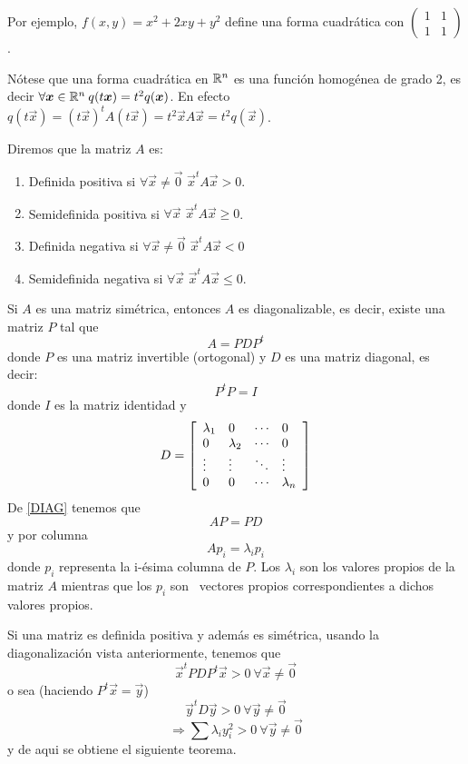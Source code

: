Por ejemplo, $f(x,y)=x^2+2xy+y^2$ define una forma cuadr\'atica con $\begin{pmatrix}
1 & 1 \\
1 & 1
\end{pmatrix}$.

N\'otese que una forma cuadr\'atica en $\mathbb{R}^n$ es una funci\'on homog\'enea de grado 2, es decir $\forall \boldsymbol{x}\in \mathbb{R}^n\: q(t\boldsymbol{x})=t^2q(\boldsymbol{x})$. En efecto $q(t\vec{x})=(t\vec{x})^t A (t\vec{x})=t^2\vec{x}A\vec{x}=t^2q(\vec{x})$.

\begin{definicion}
Diremos que la matriz $A$ es:
\begin{enumerate}
\item Definida positiva si $\forall \vec{x}\neq \vec{0}$ $\vec{x}^t A \vec{x}>0$.
\item Semidefinida positiva si $\forall \vec{x}$ $\vec{x}^t A \vec{x}\geq 0$.
\item Definida negativa si $\forall \vec{x}\neq \vec{0}$ $\vec{x}^t A \vec{x}<0$
\item Semidefinida negativa si $\forall \vec{x}$ $\vec{x}^t A \vec{x}\leq 0$.
\end{enumerate}
\end{definicion}

Si $A$ es una matriz sim\'etrica, entonces $A$ es diagonalizable, es decir,
existe una matriz $P$ tal que
\begin{equation}\label{DIAG}
A=PDP^t
\end{equation}
donde $P$ es una matriz invertible (ortogonal) y $D$ es una matriz diagonal,
es decir:
\[
P^tP=I
\]
donde $I$ es la matriz identidad y
\[
D=\left[
\begin{array}
[c]{llll}%
\lambda_{1} & 0 & \cdots & 0\\
0 & \lambda_{2} & \cdots & 0\\
\vdots & \vdots & \ddots & \vdots\\
0 & 0 & \cdots & \lambda_{n}%
\end{array}
\right]
\]
De \eqref{DIAG} tenemos que
\[
AP=PD
\]
y por columna
\[
Ap_i=\lambda_ip_i%
\]
donde $p_i$ representa la i-\'esima columna de $P$. Los $\lambda_i$ son
los valores propios de la matriz $A$ mientras que los $p_i$ son \ vectores
propios correspondientes a dichos valores propios.

Si una matriz es definida positiva y adem\'as es sim\'etrica, usando la diagonalizaci\'on vista
anteriormente, tenemos que
\[
\vec{x}^tPDP^t\vec{x}>0\:\forall \vec{x}\neq \vec{0}
\]
o sea (haciendo $P^t\vec{x}=\vec{y}$)
\[
\vec{y}^tD\vec{y}>0\:\forall \vec{y}\neq \vec{0}
\]%
\[
\Rightarrow\sum\lambda_i y_i^{2} > 0\:\forall \vec{y}\neq \vec{0}
\]
y de aqui se obtiene el siguiente teorema.

